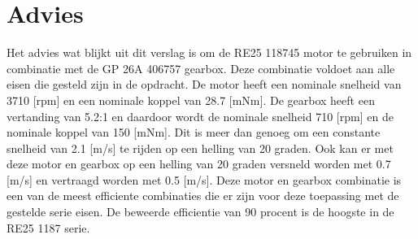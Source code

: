 \documentclass{article}
\begin{document}
\section{Advies}
    Het advies wat blijkt uit dit verslag is om de RE25 118745 motor te gebruiken in combinatie met de GP 26A 406757 gearbox. 
    Deze combinatie voldoet aan alle eisen die gesteld zijn in de opdracht.
    De motor heeft een nominale snelheid van 3710 [rpm] en een nominale koppel van 28.7 [mNm].
    De gearbox heeft een vertanding van 5.2:1 en daardoor wordt de nominale snelheid 710 [rpm] en de nominale koppel van 150 [mNm].
    Dit is meer dan genoeg om een constante snelheid van 2.1 [m/s] te rijden op een helling van 20 graden.
    Ook kan er met deze motor en gearbox op een helling van 20 graden versneld worden met 0.7 [m/s] en vertraagd worden met 0.5 [m/s].
    Deze motor en gearbox combinatie is een van de meest efficiente combinaties die er zijn voor deze toepassing met de gestelde serie eisen.
    De beweerde efficientie van 90 procent is de hoogste in de RE25 1187 serie.


\clearpage
\appendix


\end{document}
